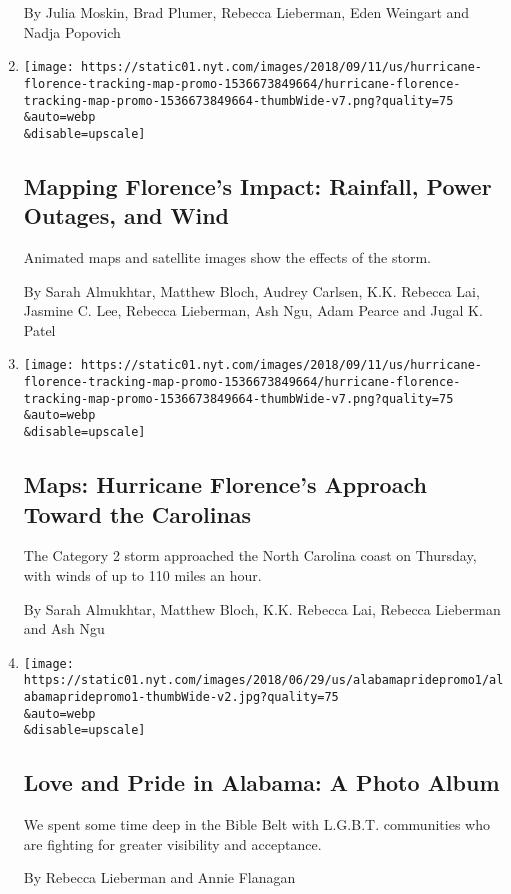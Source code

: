 \begin{enumerate}
  By Julia Moskin, Brad Plumer, Rebecca Lieberman, Eden Weingart and
  Nadja Popovich
\item
  \href{/interactive/2018/09/13/us/hurricane-florence-impact-damage-map.html}{}

  \texttt{[image: https://static01.nyt.com/images/2018/09/11/us/hurricane-florence-tracking-map-promo-1536673849664/hurricane-florence-tracking-map-promo-1536673849664-thumbWide-v7.png?quality=75\\\&auto=webp\\\&disable=upscale]}

  \hypertarget{mapping-florences-impact-rainfall-power-outages-and-wind}{%
  \subsection{Mapping Florence's Impact: Rainfall, Power Outages, and
  Wind}\label{mapping-florences-impact-rainfall-power-outages-and-wind}}

  Animated maps and satellite images show the effects of the storm.

  By Sarah Almukhtar, Matthew Bloch, Audrey Carlsen, K.K. Rebecca Lai,
  Jasmine C. Lee, Rebecca Lieberman, Ash Ngu, Adam Pearce and Jugal K.
  Patel
\item
  \href{/interactive/2018/09/10/us/hurricane-florence-tracking-map.html}{}

  \texttt{[image: https://static01.nyt.com/images/2018/09/11/us/hurricane-florence-tracking-map-promo-1536673849664/hurricane-florence-tracking-map-promo-1536673849664-thumbWide-v7.png?quality=75\\\&auto=webp\\\&disable=upscale]}

  \hypertarget{maps-hurricane-florences-approach-toward-the-carolinas}{%
  \subsection{Maps: Hurricane Florence's Approach Toward the
  Carolinas}\label{maps-hurricane-florences-approach-toward-the-carolinas}}

  The Category 2 storm approached the North Carolina coast on Thursday,
  with winds of up to 110 miles an hour.

  By Sarah Almukhtar, Matthew Bloch, K.K. Rebecca Lai, Rebecca Lieberman
  and Ash Ngu
\item
  \href{/interactive/2018/06/29/us/alabama-lgbt-gay-communities-organizations.html}{}

  \texttt{[image: https://static01.nyt.com/images/2018/06/29/us/alabamapridepromo1/alabamapridepromo1-thumbWide-v2.jpg?quality=75\\\&auto=webp\\\&disable=upscale]}

  \hypertarget{love-and-pride-in-alabama-a-photo-album}{%
  \subsection{Love and Pride in Alabama: A Photo
  Album}\label{love-and-pride-in-alabama-a-photo-album}}

  We spent some time deep in the Bible Belt with L.G.B.T. communities
  who are fighting for greater visibility and acceptance.

  By Rebecca Lieberman and Annie Flanagan
\end{enumerate}

